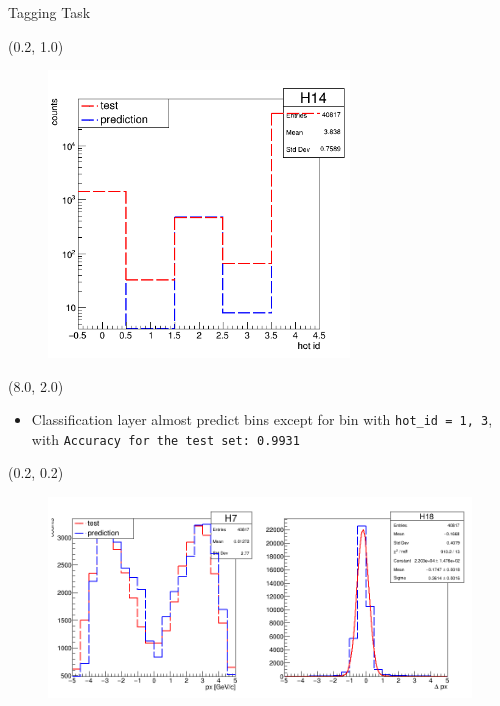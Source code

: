 \documentclass[12pt, xcolor={dvipsnames}, aspectratio = 169]{beamer}
\begin{document}
\begin{frame}[fragile]{Tagging Task}
    \begin{textblock}{8.0}(0.2, 1.0)
        \begin{figure}
            \centering
            \includegraphics[width=8.0cm]{../imgs/hot_id.png}
        \end{figure}
    \end{textblock}
    
    \begin{textblock}{7.0}(8.0, 2.0)
    
    \begin{itemize}
        \item Classification layer almost predict bins except for bin with \verb|hot_id = 1, 3|, with 
        \verb|Accuracy for the test set: 0.9931|
    \end{itemize}
    
    \end{textblock}
    
\end{frame}


\begin{frame}

\begin{textblock}{14.0}(0.2, 0.2)
    \begin{figure}
        \centering
        \includegraphics[width=14.0cm]{../imgs/vpx.png}
    \end{figure}
\end{textblock}

\end{frame}
\end{document}
